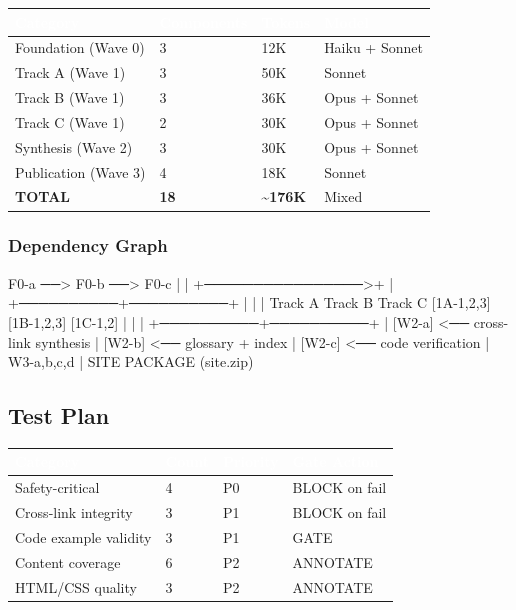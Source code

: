 \documentclass[11pt,letterpaper]{article}
\newcommand{\tableheader}[1]{\textbf{\sffamily\textcolor{white}{#1}}}
\begin{document}
\begin{center}
\begin{tabularx}{\textwidth}{L{4cm}C{2cm}C{2cm}C{3cm}}
\toprule
{}
\tableheader{Category} & \tableheader{Components} & \tableheader{Tokens} & \tableheader{Model} \\
\midrule
Foundation (Wave 0) & 3 & 12K & Haiku + Sonnet \\
Track A (Wave 1) & 3 & 50K & Sonnet \\
Track B (Wave 1) & 3 & 36K & Opus + Sonnet \\
Track C (Wave 1) & 2 & 30K & Opus + Sonnet \\
Synthesis (Wave 2) & 3 & 30K & Opus + Sonnet \\
Publication (Wave 3) & 4 & 18K & Sonnet \\
\midrule
\textbf{TOTAL} & \textbf{18} & \textbf{\textasciitilde 176K} & Mixed \\
\bottomrule
\end{tabularx}
\end{center}

\subsubsection{Dependency Graph}

\begin{asciibox}
F0-a ──> F0-b ──> F0-c
  |                 |
  +────────────────>+
                    |
         +──────────+──────────+
         |          |          |
      Track A    Track B    Track C
      [1A-1,2,3] [1B-1,2,3] [1C-1,2]
         |          |          |
         +──────────+──────────+
                    |
                 [W2-a] <── cross-link synthesis
                    |
                 [W2-b] <── glossary + index
                    |
                 [W2-c] <── code verification
                    |
               W3-a,b,c,d
                    |
             SITE PACKAGE (site.zip)
\end{asciibox}

\subsection{Test Plan}

\begin{center}
\begin{tabularx}{\textwidth}{L{3.5cm}C{1.5cm}L{1.5cm}L{2cm}}
\toprule
{}
\tableheader{Category} & \tableheader{Count} & \tableheader{Priority} & \tableheader{Gate Action} \\
\midrule
Safety-critical & 4 & P0 & BLOCK on fail \\
Cross-link integrity & 3 & P1 & BLOCK on fail \\
Code example validity & 3 & P1 & GATE \\
Content coverage & 6 & P2 & ANNOTATE \\
HTML/CSS quality & 3 & P2 & ANNOTATE \\
\bottomrule
\end{tabularx}
\end{center}
\end{document}
